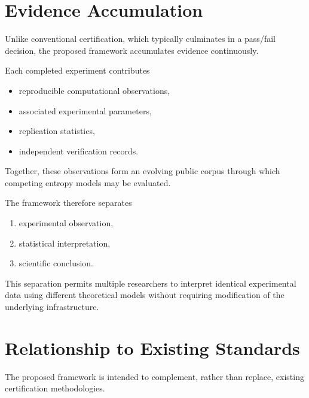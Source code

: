 \documentclass[11pt]{article}
\begin{document}
\section{Evidence Accumulation}

Unlike conventional certification,
which typically culminates in a pass/fail decision,
the proposed framework accumulates evidence continuously.

Each completed experiment contributes

\begin{itemize}

\item reproducible computational observations,

\item associated experimental parameters,

\item replication statistics,

\item independent verification records.

\end{itemize}

Together,
these observations form an evolving public corpus
through which competing entropy models may be evaluated.

The framework therefore separates

\begin{enumerate}

\item experimental observation,

\item statistical interpretation,

\item scientific conclusion.

\end{enumerate}

This separation permits multiple researchers
to interpret identical experimental data
using different theoretical models
without requiring modification of the underlying infrastructure.


\section{Relationship to Existing Standards}

The proposed framework is intended to complement,
rather than replace,
existing certification methodologies.
\end{document}
